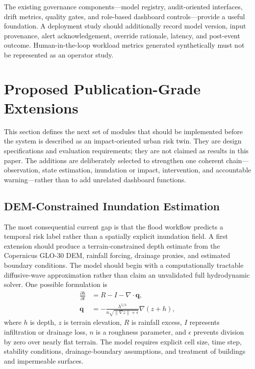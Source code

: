 \documentclass[journal]{IEEEtran}
\begin{document}
The existing governance components---model registry, audit-oriented interfaces, drift metrics, quality gates, and role-based dashboard controls---provide a useful foundation. A deployment study should additionally record model version, input provenance, alert acknowledgement, override rationale, latency, and post-event outcome. Human-in-the-loop workload metrics generated synthetically must not be represented as an operator study.

\section{Proposed Publication-Grade Extensions}
This section defines the next set of modules that should be implemented before the system is described as an impact-oriented urban risk twin. They are design specifications and evaluation requirements; they are not claimed as results in this paper. The additions are deliberately selected to strengthen one coherent chain---observation, state estimation, inundation or impact, intervention, and accountable warning---rather than to add unrelated dashboard functions.

\subsection{DEM-Constrained Inundation Estimation}
The most consequential current gap is that the flood workflow predicts a temporal risk label rather than a spatially explicit inundation field. A first extension should produce a terrain-constrained depth estimate from the Copernicus GLO-30 DEM, rainfall forcing, drainage proxies, and estimated boundary conditions. The model should begin with a computationally tractable diffusive-wave approximation rather than claim an unvalidated full hydrodynamic solver. One possible formulation is
\begin{align}
\frac{\partial h}{\partial t} &= R-I-\nabla\cdot\mathbf{q},\\
\mathbf{q} &= -\frac{h^{5/3}}{n\sqrt{\|\nabla z\|+\epsilon}}\nabla(z+h),
\label{eq:diffusive}
\end{align}
where $h$ is depth, $z$ is terrain elevation, $R$ is rainfall excess, $I$ represents infiltration or drainage loss, $n$ is a roughness parameter, and $\epsilon$ prevents division by zero over nearly flat terrain. The model requires explicit cell size, time step, stability conditions, drainage-boundary assumptions, and treatment of buildings and impermeable surfaces.
\end{document}
